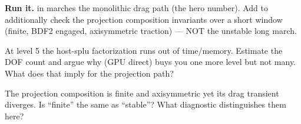 \begin{runbox}\textbf{Run it.}  in
 marches the monolithic drag path (the hero
number). Add  to additionally check the projection
composition invariants over a short window (finite, BDF2 engaged,
axisymmetric traction) --- NOT the unstable long march.\end{runbox}

\question At level 5 the host-splu factorization runs out of time/memory.
Estimate the DOF count and argue why  (GPU direct) buys you one
more level but not many. What does that imply for the projection path?

\question The projection composition is finite and axisymmetric yet its
drag transient diverges. Is ``finite'' the same as ``stable''? What
diagnostic distinguishes them here?
